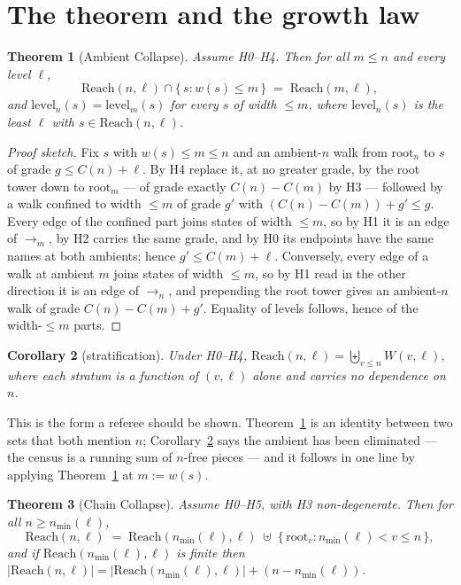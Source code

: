 \documentclass[11pt,a4paper]{article}
\theoremstyle{plain}
\newtheorem{theorem}{Theorem}
\newtheorem{corollary}[theorem]{Corollary}
\theoremstyle{definition}
\theoremstyle{remark}
\newcommand{\Reach}{\mathrm{Reach}}
\newcommand{\wid}{w}
\newcommand{\nmin}{n_{\min}}
\begin{document}
\section{The theorem and the growth law}\label{sec:theorem}

\begin{theorem}[Ambient Collapse]\label{thm:partI}
Assume H0--H4. Then for all $m \le n$ and every level $\ell$,
\[
\Reach(n,\ell) \cap \{\, s : \wid(s) \le m \,\} \;=\; \Reach(m,\ell),
\]
and $\mathrm{level}_n(s) = \mathrm{level}_m(s)$ for every $s$ of width
$\le m$, where $\mathrm{level}_n(s)$ is the least $\ell$ with
$s \in \Reach(n,\ell)$.
\end{theorem}

\begin{proof}[Proof sketch]
Fix $s$ with $\wid(s) \le m \le n$ and an ambient-$n$ walk from
$\mathrm{root}_n$ to $s$ of grade $g \le C(n) + \ell$. By H4 replace it, at no
greater grade, by the root tower down to $\mathrm{root}_m$ --- of grade exactly
$C(n) - C(m)$ by H3 --- followed by a walk confined to width $\le m$ of grade
$g'$ with $(C(n)-C(m)) + g' \le g$. Every edge of the confined part joins states
of width $\le m$, so by H1 it is an edge of $\to_m$, by H2 carries the same
grade, and by H0 its endpoints have the same names at both ambients; hence
$g' \le C(m) + \ell$. Conversely, every edge of a walk at ambient $m$ joins
states of width $\le m$, so by H1 read in the other direction it is an edge of
$\to_n$, and prepending the root tower gives an ambient-$n$ walk of grade
$C(n)-C(m)+g'$. Equality of levels follows, hence of the width-$\le m$ parts.
\end{proof}

\begin{corollary}[stratification]\label{cor:strat}
Under H0--H4, $\Reach(n,\ell) = \biguplus_{v \le n} W(v,\ell)$, where each
stratum is a function of $(v,\ell)$ alone and carries no dependence on $n$.
\end{corollary}

This is the form a referee should be shown. Theorem~\ref{thm:partI} is an
identity between two sets that both mention $n$; Corollary~\ref{cor:strat} says
the ambient has been eliminated --- the census is a running sum of $n$-free
pieces --- and it follows in one line by applying Theorem~\ref{thm:partI} at
$m := \wid(s)$.

\begin{theorem}[Chain Collapse]\label{thm:partII}
Assume H0--H5, with H3 non-degenerate. Then for all $n \ge \nmin(\ell)$,
\[
\Reach(n,\ell) \;=\; \Reach(\nmin(\ell),\ell) \;\uplus\;
\{\, \mathrm{root}_v : \nmin(\ell) < v \le n \,\},
\]
and if $\Reach(\nmin(\ell),\ell)$ is finite then
$|\Reach(n,\ell)| = |\Reach(\nmin(\ell),\ell)| + (n - \nmin(\ell))$.
\end{theorem}
\end{document}
